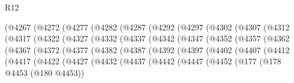 \begin{lexlean}{R12}
\begin{coremodule}
            (@4267
              (@4272
                (@4277
                  (@4282
                    (@4287
                      (@4292
                        (@4297
                          (@4302
                            (@4307
                              (@4312
                                (@4317
                                  (@4322
                                    (@4327
                                      (@4332
                                        (@4337
                                          (@4342
                                            (@4347
                                              (@4352
                                                (@4357
                                                  (@4362
                                                    (@4367
                                                      (@4372
                                                        (@4377
                                                          (@4382
                                                            (@4387
                                                              (@4392
                                                                (@4397
                                                                  (@4402
                                                                    (@4407
                                                                      (@4412
                                                                        (@4417
                                                                          (@4422
                                                                            (@4427
                                                                              (@4432
                                                                                (@4437
                                                                                  (@4442
                                                                                    (@4447
                                                                                      (@4452
                                                                                        (@177
                                                                                          (@178
                                                                                            @4453
                                                                                            (@180
                                                                                              @4453))

\end{coremodule}
\end{lexlean}
